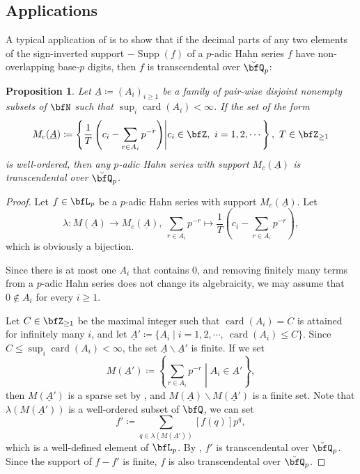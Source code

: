 \documentclass[english,oneside]{smfart}
\newcommand{\opn}[1]{\operatorname{#1}}
\newcommand{\lto}{\longrightarrow}
\newtheorem{proposition}[theorem]{Proposition}
\begin{document}
\subsection{Applications}
A typical application of  is to show that if the decimal parts of any two elements of the sign-inverted support $-\opn{Supp}(f)$ of a $p$-adic Hahn series $f$ have non-overlapping base-$p$ digits, then $f$ is transcendental over $\breve{\bfQ}_p$:
\begin{proposition}\label{prop:15994}
    Let $\underline{A}\coloneqq(A_i)_{i\geq 1}$ be a family of pair-wise disjoint nonempty subsets of $\bfN$ such that $\sup_i \opn{card}(A_i)<\infty$. If the set of the form
    $$M_c(\underline{A})\coloneqq\left\{\frac{1}{T}\left(c_i-\sum_{r\in A_i}p^{-r}\right)\middle\vert c_i\in\bfZ,\ i=1,2,\cdots\right\},\ T\in\bfZ_{\geq 1}$$
    is well-ordered, then any $p$-adic Hahn series with support $M_c(\underline{A})$ is transcendental over $\breve{\bfQ}_p$.
\end{proposition}
\begin{proof}
    Let $f\in\bfL_p$ be a $p$-adic Hahn series with support $M_c(\underline{A})$. Let 
    $$\lambda\colon M(\underline{A})\lto M_c(\underline{A}),\ \sum_{r\in A_i}p^{-r}\longmapsto \frac{1}{T}\left(c_i-\sum_{r\in A_i}p^{-r}\right),$$
    which is obviously a bijection.

    Since there is at most one $A_i$ that contains $0$, and removing finitely many terms from a $p$-adic Hahn series does not change its algebraicity, we may assume that $0\notin A_i$ for every $i\geq 1$. 
    
    Let $C\in\bfZ_{\geq 1}$ be the maximal integer such that $\opn{card}(A_i)=C$ is attained for infinitely many $i$, and let $\underline{A}'\coloneqq\{A_i\mid i=1,2,\cdots,\ \opn{card}(A_i)\leq C\}$. Since $C\leq \sup_i \opn{card}(A_i)<\infty$, the set $\underline{A}\backslash \underline{A}'$ is finite. If we set
    $$M(\underline{A}')\coloneqq \left\{\sum_{r\in A_i}p^{-r}\middle\vert A_i\in\underline{A}'\right\},$$
    then $M(\underline{A}')$ is a sparse set by , and $M(\underline{A})\backslash M(\underline{A}')$ is a finite set. Note that $\lambda(M(\underline{A}'))$ is a well-ordered subset of $\bfQ$, we can set
    $$f'\coloneqq \sum_{q\in \lambda(M(\underline{A}'))}[f(q)]p^q,$$
    which is a well-defined element of $\bfL_p$. By , $f'$ is transcendental over $\breve{\bfQ}_p$. Since the support of $f-f'$ is finite, $f$ is also transcendental over $\breve{\bfQ}_p$.
\end{proof}
\end{document}
